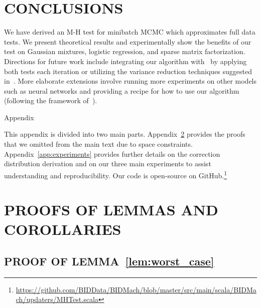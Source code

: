 \documentclass[letterpaper]{article}
\begin{document}
\section{CONCLUSIONS}\label{sec:conclusion}

We have derived an M-H test for minibatch MCMC which approximates full data
tests. We present theoretical results and experimentally show the benefits of
our test on Gaussian mixtures, logistic regression, and sparse matrix
factorization.  Directions for future work include integrating our algorithm
with~\citep{cutting_mh_2014} by applying both tests each iteration or utilizing
the variance reduction techniques suggested in~\citep{DBLP:conf/icml/ChenG16}.
More elaborate extensions involve running more experiments on other models such
as neural networks and providing a recipe for how to use our algorithm
(following the framework of~\citep{sgmcmc_2015}).






\clearpage
\appendix


\onecolumn
\begin{center}
{\Large Appendix}
\end{center}

This appendix is divided into two main parts. Appendix~\ref{app:proofs} provides
the proofs that we omitted from the main text due to space constraints.
Appendix~\ref{app:experiments} provides further details on the correction
distribution derivation and on our three main experiments to assist
understanding and reproducibility. Our code is open-source on
GitHub.\footnote{\url{https://github.com/BIDData/BIDMach/blob/master/src/main/scala/BIDMach/updaters/MHTest.scala}}


\section{PROOFS OF LEMMAS AND COROLLARIES}\label{app:proofs}

\subsection{PROOF OF LEMMA~\ref{lem:worst_case}}\label{app:worst_case_proof}
\end{document}
